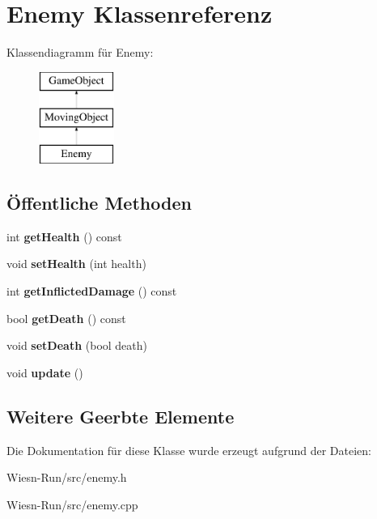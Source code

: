 \hypertarget{classEnemy}{\section{Enemy Klassenreferenz}
\label{classEnemy}
}
Klassendiagramm für Enemy\-:\begin{figure}[H]
\begin{center}
\leavevmode
\includegraphics[height=3.000000cm]{classEnemy}
\end{center}
\end{figure}
\subsection*{Öffentliche Methoden}
\begin{DoxyCompactItemize}
\item 
\hypertarget{classEnemy_ae9cfe69594b5fabec06d22f77ddce202}{int {\bfseries get\-Health} () const }\label{classEnemy_ae9cfe69594b5fabec06d22f77ddce202}

\item 
\hypertarget{classEnemy_a48f9331e93449f27c8d6374c75c81363}{void {\bfseries set\-Health} (int health)}\label{classEnemy_a48f9331e93449f27c8d6374c75c81363}

\item 
\hypertarget{classEnemy_a5f969adca5809e5ff5a83ef20b19826d}{int {\bfseries get\-Inflicted\-Damage} () const }\label{classEnemy_a5f969adca5809e5ff5a83ef20b19826d}

\item 
\hypertarget{classEnemy_aae82e3d3056d5981037100683bdae94d}{bool {\bfseries get\-Death} () const }\label{classEnemy_aae82e3d3056d5981037100683bdae94d}

\item 
\hypertarget{classEnemy_a749a1a8932d9b067e3770fb1425f216b}{void {\bfseries set\-Death} (bool death)}\label{classEnemy_a749a1a8932d9b067e3770fb1425f216b}

\item 
\hypertarget{classEnemy_ad55ee71b5a8c23fbd00b3c368b90cc64}{void {\bfseries update} ()}\label{classEnemy_ad55ee71b5a8c23fbd00b3c368b90cc64}

\end{DoxyCompactItemize}
\subsection*{Weitere Geerbte Elemente}


Die Dokumentation für diese Klasse wurde erzeugt aufgrund der Dateien\-:\begin{DoxyCompactItemize}
\item 
Wiesn-\/\-Run/src/enemy.\-h\item 
Wiesn-\/\-Run/src/enemy.\-cpp\end{DoxyCompactItemize}
